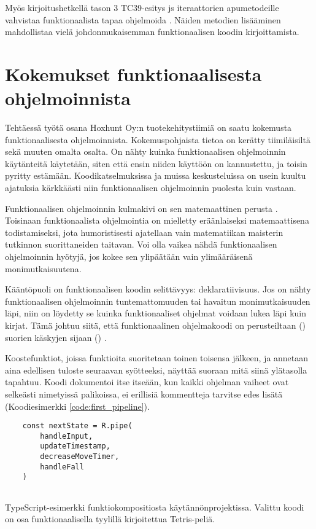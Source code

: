 Myös kirjoitushetkellä tason 3 TC39-esitys \gls{js} iteraattorien apumetodeille vahvistaa funktionaalista tapaa ohjelmoida \cite{tc39_iterator_helpers}. Näiden metodien lisääminen mahdollistaa vielä johdonmukaisemman funktionaalisen koodin kirjoittamista.

\section{Kokemukset funktionaalisesta ohjelmoinnista}


Tehtäessä työtä osana Hoxhunt Oy:n tuotekehitystiimiä on saatu kokemusta funktionaalisesta ohjelmoinnista. Kokemuspohjaista tietoa on kerätty tiimiläisiltä sekä muuten omalta osalta. On nähty kuinka funktionaalisen ohjelmoinnin käytänteitä käytetään, siten että ensin niiden käyttöön on kannustettu, ja toisin pyritty estämään. Koodikatselmuksissa ja muissa keskusteluissa on usein kuultu ajatuksia kärkkäästi niin funktionaalisen ohjelmoinnin puolesta kuin vastaan.

Funktionaalisen ohjelmoinnin kulmakivi on sen matemaattinen perusta \cite{computerphile_lambda,Tan2004}. Toisinaan funktionaalista ohjelmointia on mielletty eräänlaiseksi matemaattisena todistamiseksi, jota humoristisesti ajatellaan vain matematiikan maisterin tutkinnon suorittaneiden taitavan. Voi olla vaikea nähdä funktionaalisen ohjelmoinnin hyötyjä, jos kokee sen ylipäätään vain ylimääräisenä monimutkaisuutena.

Kääntöpuoli on funktionaalisen koodin selittävyys: deklaratiivisuus. Jos on nähty funktionaalisen ohjelmoinnin tuntemattomuuden tai havaitun monimutkaisuuden läpi, niin on löydetty se kuinka funktionaaliset ohjelmat voidaan lukea läpi kuin kirjat. Tämä johtuu siitä, että funktionaalinen ohjelmakoodi on perusteiltaan () suorien käskyjen sijaan () \cite{ms:fp_vs_imperative}.

Koostefunktiot, joissa funktioita suoritetaan toinen toisensa jälkeen, ja annetaan aina edellisen tuloste seuraavan syötteeksi, näyttää suoraan mitä siinä ylätasolla tapahtuu. Koodi dokumentoi itse itseään, kun kaikki ohjelman vaiheet ovat selkeästi nimetyissä palikoissa, ei erillisiä kommentteja tarvitse edes lisätä  (Koodiesimerkki \ref{code:first_pipeline}).

\begin{code}
    \begin{verbatim}
    const nextState = R.pipe(
        handleInput,
        updateTimestamp,
        decreaseMoveTimer,
        handleFall
    )
    
\end{verbatim}
    \caption{TypeScript-esimerkki funktiokompositiosta käytännönprojektissa. Valittu koodi on osa funktionaalisella tyylillä kirjoitettua Tetris-peliä.}
    \label{code:first_pipeline}
\end{code}


